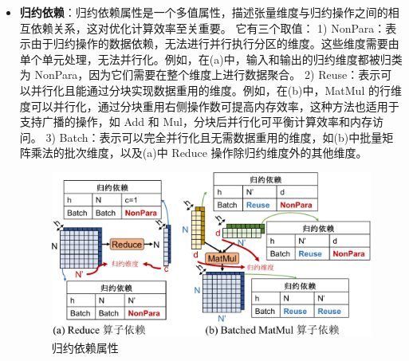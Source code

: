 \begin{itemize}
\item
\textbf{归约依赖}：归约依赖属性是一个多值属性，描述张量维度与归约操作之间的相互依赖关系，这对优化计算效率至关重要。
它有三个取值：
1) NonPara：表示由于归约操作的数据依赖，无法进行并行执行分区的维度。这些维度需要由单个单元处理，无法并行化。例如，在(a)中，输入和输出的归约维度都被归类为 NonPara，因为它们需要在整个维度上进行数据聚合。
2) Reuse：表示可以并行化且能通过分块实现数据重用的维度。例如，在(b)中，MatMul 的行维度可以并行化，通过分块重用右侧操作数可提高内存效率，这种方法也适用于支持广播的操作，如 Add 和 Mul，分块后并行化可平衡计算效率和内存访问。
3) Batch：表示可以完全并行化且无需数据重用的维度，如(b)中批量矩阵乘法的批次维度，以及(a)中 Reduce 操作除归约维度外的其他维度。

\begin{figure}[ht]
    \centering
    \includegraphics[width=0.7\linewidth]{figures/flashtensor/property_definition_dependency-crop.pdf}
    \caption{归约依赖属性}
    \label{fig:property_definition_dependency}
\end{figure}


\end{itemize}
